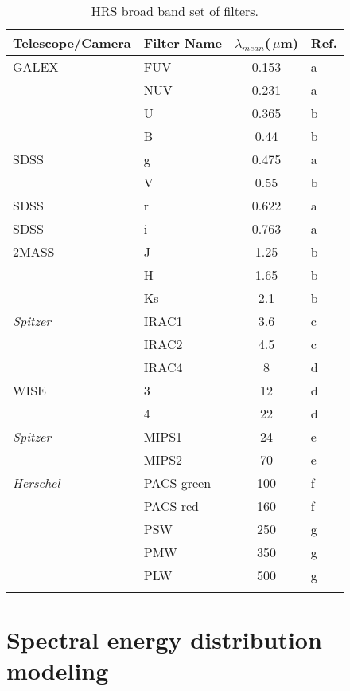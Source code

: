 \documentclass[traditabstract]{aa} %
\def \microns{{\,$\mu$m}}
\begin{document}
\begin{table}
	\centering
	\caption{HRS broad band set of filters.}
	\begin{tabular}{ l l c l }
	 \hline\hline
	Telescope/Camera & Filter Name & $\lambda_{mean}$(\microns) & Ref.\\ 
	\hline
	GALEX & FUV &  0.153 & a \\
				 & NUV & 0.231& a \\
				& U & 0.365 & b\\
				& B & 0.44 & b\\
	SDSS	& g & 0.475 & a\\
				& V & 0.55 & b\\
	SDSS	& r & 0.622 & a\\
	SDSS	& i	& 0.763 & a\\		 
	2MASS &  J & 1.25 & b \\
			 &  H & 1.65 & b \\
			 & Ks & 2.1 &  b \\
	\textit{Spitzer}& IRAC1& 3.6 & c\\
			& IRAC2 & 4.5  & c \\
			& IRAC4 & 8 & d \\
	WISE & 3	& 12  & d \\
			& 4 & 22 &  d\\
	\textit{Spitzer}		& MIPS1 & 24 & e\\
			& MIPS2 & 70  & e\\
	\textit{Herschel}& PACS green & 100 & f\\
			& PACS red & 160 & f\\
			& PSW & 250 & g\\
			& PMW & 350 & g\\
			& PLW & 500 & g\\
	\hline
	\label{filt}
	\end{tabular}
\end{table}

\section{\label{sedmod}Spectral energy distribution modeling}
\end{document}
